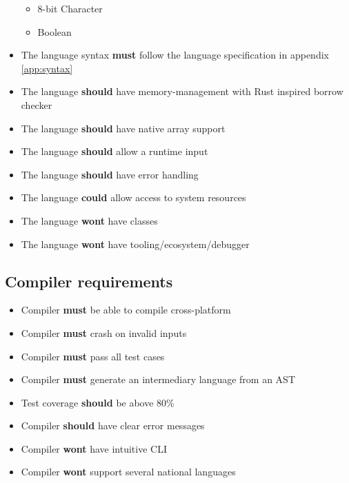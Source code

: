 \begin{itemize}
\begin{itemize}
\item 8-bit Character
\item Boolean
\end{itemize}
\item The language syntax \textbf{must} follow the language specification in appendix \ref{app:syntax}
\item The language \textbf{should} have memory-management with Rust inspired borrow checker
\item The language \textbf{should} have native array support
\item The language \textbf{should} allow a runtime input
\item The language \textbf{should} have error handling
\item The language \textbf{could} allow access to system resources
\item The language \textbf{wont} have classes
\item The language \textbf{wont} have tooling/ecosystem/debugger
\end{itemize}

\subsection{Compiler requirements} %

\begin{itemize}
\item Compiler \textbf{must} be able to compile cross-platform
\item Compiler \textbf{must} crash on invalid inputs
\item Compiler \textbf{must} pass all test cases
\item Compiler \textbf{must} generate an intermediary language from an AST
\item Test coverage \textbf{should} be above 80\%
\item Compiler \textbf{should} have clear error messages
\item Compiler \textbf{wont} have intuitive CLI
\item Compiler \textbf{wont} support several national languages
\end{itemize}

\newpage
